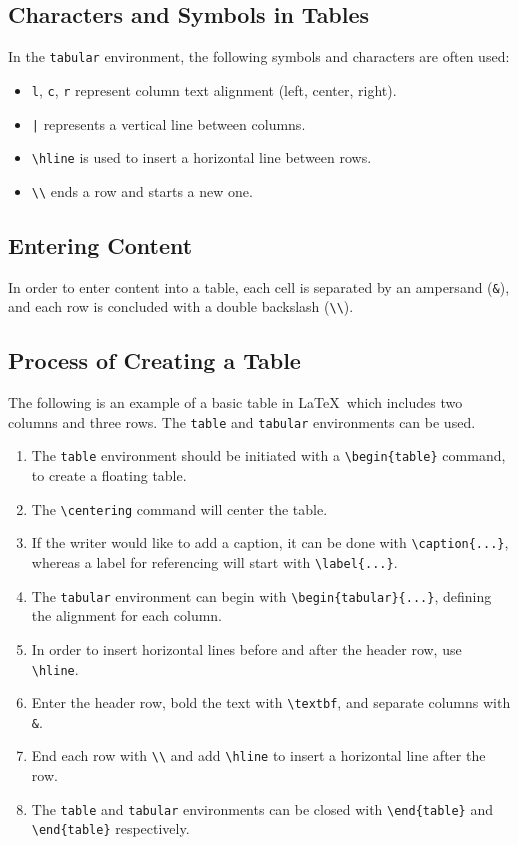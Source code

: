 \documentclass[12pt,journal,compsoc]{IEEEtran}
\begin{document}
\subsection{Characters and Symbols in Tables}
In the \texttt{tabular} environment, the following symbols and characters are often used:
\begin{itemize}
    \item \texttt{l}, \texttt{c}, \texttt{r} represent column text alignment (left, center, right).
    \item \texttt{|} represents a vertical line between columns.
    \item \texttt{\textbackslash hline} is used to insert a horizontal line between rows.
    \item \texttt{\textbackslash\textbackslash} ends a row and starts a new one.
\end{itemize}

\subsection{Entering Content}
In order to enter content into a table, each cell is separated by an ampersand (\texttt{\&}), and each row is concluded with a double backslash (\texttt{\textbackslash\textbackslash}). 

\subsection{Process of Creating a Table}
The following is an example of a basic table in \LaTeX\, which includes two columns and three rows. The \texttt{table} and \texttt{tabular} environments can be used.  

\begin{enumerate}
    \item The \texttt{table} environment should be initiated with a \texttt{\textbackslash begin\{table\}} command, to create a floating table.
    \item The \texttt{\textbackslash centering} command will center the table. 
    \item If the writer would like to add a caption, it can be done with \texttt{\textbackslash caption\{...\}}, whereas a label for referencing will start with \texttt{\textbackslash label\{...\}}.
    \item The \texttt{tabular} environment can begin with \texttt{\textbackslash begin\{tabular\}\{...\}}, defining the alignment for each column.  
    \item In order to insert horizontal lines before and after the header row, use \texttt{\textbackslash hline}. 
    \item Enter the header row, bold the text with \texttt{\textbackslash textbf}, and separate columns with \texttt{\&}.
    \item End each row with \texttt{\textbackslash\textbackslash} and add \texttt{\textbackslash hline} to insert a horizontal line after the row.
    \item The \texttt{table} and \texttt{tabular} environments can be closed with \texttt{\textbackslash end\{table\}} and \texttt{\textbackslash end\{table\}} respectively.
\end{enumerate}
\end{document}
